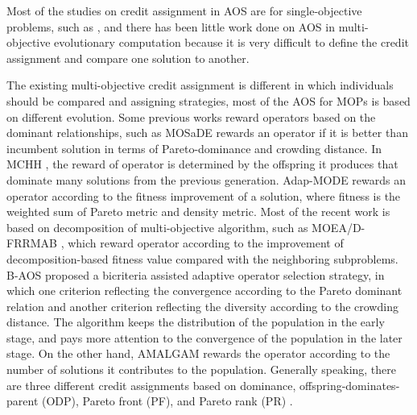\documentclass[journal]{IEEEtran}
\begin{document}
Most of the studies on credit assignment in AOS are for single-objective problems, such as \cite{fialho2009dynamic,fialho2009dynamic,cowling2000hyperheuristic}, and there has been little work done on AOS in multi-objective evolutionary computation because it is very difficult to define the credit assignment and compare one solution to another.

The existing multi-objective credit assignment is different in which individuals should be compared and assigning strategies, most of the AOS for MOPs is based on different evolution.
Some previous works reward operators based on the dominant relationships,
such as MOSaDE \cite{huang2007multi} rewards an operator if it is better than incumbent solution in terms of Pareto-dominance and crowding distance.
In MCHH \cite{mcclymont2011markov}, the reward of operator is determined by the offspring it produces that dominate many solutions from the previous generation. Adap-MODE \cite{li2011multi} rewards an operator according to the fitness improvement of a solution, where fitness is the weighted sum of Pareto metric and density metric.
Most of the recent work is based on decomposition of multi-objective algorithm, such as MOEA/D-FRRMAB \cite{frrmab}, which reward operator according to the improvement of decomposition-based fitness value compared with the neighboring subproblems.
B-AOS \cite{lin2021decomposition} proposed a bicriteria assisted adaptive operator selection strategy, in which one criterion reflecting the convergence according to the Pareto dominant relation and another criterion reflecting the diversity according to the crowding distance.
The algorithm keeps the distribution of the population in the early stage, and pays more attention to the convergence of the population in the later stage.
On the other hand, AMALGAM \cite{vrugt2007improved} rewards the operator according to the number of solutions it contributes to the population.
Generally speaking, there are three different credit assignments based on dominance, offspring-dominates-parent (ODP), Pareto front (PF), and Pareto rank (PR) \cite{hitomi2015effect}.
\end{document}
